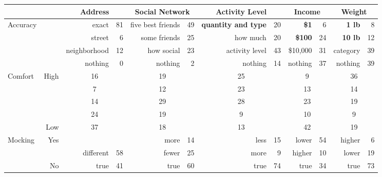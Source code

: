 
\begin{tabularx}{\textwidth}{Xr@{\hskip 0.2in}rr@{\hskip 0.2in}rr@{\hskip 0.2in}rr@{\hskip 0.2in}rr@{\hskip 0.2in}rr}
&&\multicolumn{2}{c}{\normalsize{\textbf{Address}}}&\multicolumn{2}{c}{\normalsize{\textbf{Social Network}}}&\multicolumn{2}{c}{\normalsize{\textbf{Activity Level}}}&\multicolumn{2}{c}{\normalsize{\textbf{Income}}}&\multicolumn{2}{c}{\normalsize{\textbf{Weight}}}\\ \toprule
\multirow{4}{*}{\normalsize{Accuracy}}& & exact & 81 & five best friends & 49 & \textbf{quantity and type} & 20 & \textbf{\$1} & 6 & \textbf{1 lb} & 8  \\
& & street & 6 & some friends & 25 & how much & 20 & \textbf{\$100} & 24 & \textbf{10 lb} & 12  \\
& & neighborhood & 12 & how social & 23 & activity level & 43 & \$10,000 & 31 & category & 39  \\
& & nothing & 0 & nothing & 2 & nothing & 14 & nothing & 37 & nothing & 39  \\ \midrule
\multirow{5}{*}{\normalsize{Comfort}} & High & \multicolumn{2}{c}{16} & \multicolumn{2}{c}{19} & \multicolumn{2}{c}{25} & \multicolumn{2}{c}{9} & \multicolumn{2}{c}{36}  \\
 &  & \multicolumn{2}{c}{7} & \multicolumn{2}{c}{12} & \multicolumn{2}{c}{23} & \multicolumn{2}{c}{13} & \multicolumn{2}{c}{14}  \\
 &  & \multicolumn{2}{c}{14} & \multicolumn{2}{c}{29} & \multicolumn{2}{c}{28} & \multicolumn{2}{c}{23} & \multicolumn{2}{c}{19}  \\
 &  & \multicolumn{2}{c}{24} & \multicolumn{2}{c}{19} & \multicolumn{2}{c}{9} & \multicolumn{2}{c}{10} & \multicolumn{2}{c}{9}  \\
 & Low & \multicolumn{2}{c}{37} & \multicolumn{2}{c}{18} & \multicolumn{2}{c}{13} & \multicolumn{2}{c}{42} & \multicolumn{2}{c}{19}  \\ \midrule
\multirow{3}{*}{\normalsize{Mocking}} & \multirow{2}{*}{\normalsize{Yes}} &  &  & more & 14 & less & 15 & lower & 54 & higher & 6  \\
 &  & different & 58 & fewer & 25 & more & 9 & higher & 10 & lower & 19  \\
 & \normalsize{No} & true & 41 & true & 60 & true & 74 & true & 34 & true & 73  \\ \midrule

\end{tabularx}

